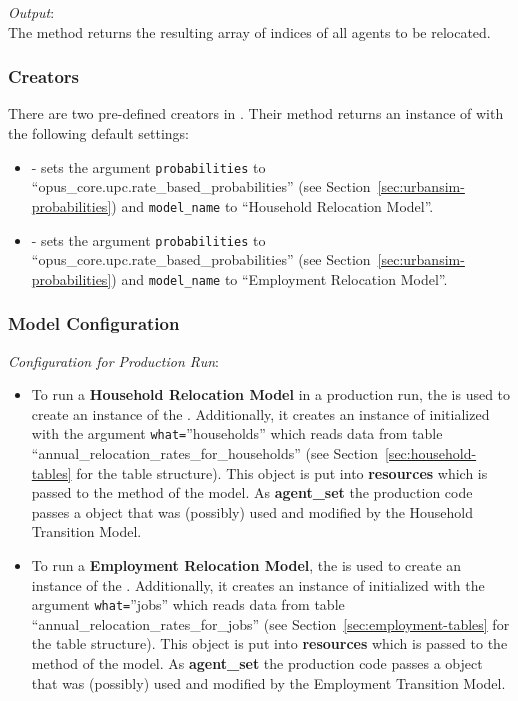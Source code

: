 {\it Output}:~\\[1mm]
The method returns the resulting array of indices of all agents to be
relocated.

%
\subsubsection{Creators}
%
There are two pre-defined creators in . Their method
 returns an instance of
 with the following default settings:
\begin{itemize}
\item {} - sets the argument
  \verb|probabilities| to ``opus_core.upc.rate_based_probabilities''
  (see Section~\ref{sec:urbansim-probabilities}) and \verb|model_name| to
  ``Household Relocation Model''. 
\item {} - sets the argument
  \verb|probabilities| to
  ``opus_core.upc.rate_based_probabilities'' (see
  Section~\ref{sec:urbansim-probabilities}) and \verb|model_name| to
  ``Employment Relocation Model''.  
\end{itemize}

%
\subsubsection{Model Configuration}
\modelsindex
%
{\em Configuration for Production Run}:
\begin{itemize}
\item To run a {\bf Household Relocation Model} in a production run, the
   is used to create an instance of the
  . Additionally, it creates an instance of
   initialized with the argument \verb|what=|''households''
  which reads data from table ``annual_relocation_rates_for_households'' (see
  Section~\ref{sec:household-tables} for the table structure). This object is
  put into {\bf resources} which is passed to the  method of
  the model. As {\bf agent_set} the production code passes a
   object that was (possibly) used and modified by the
  Household Transition Model. 
\item To run a {\bf Employment Relocation Model}, the
   is used to create an instance of the
  . Additionally, it creates an instance of
   initialized with the argument \verb|what=|''jobs''
  which reads data from table ``annual_relocation_rates_for_jobs'' (see
  Section~\ref{sec:employment-tables} for the table structure). This object is
  put into {\bf resources} which is passed to the  method of
  the model. As {\bf agent_set} the production code passes a
   object that was (possibly) used and modified by the
  Employment Transition Model. 
\end{itemize}

